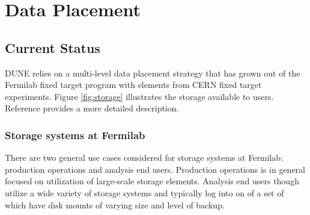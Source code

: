 \documentclass[../main-v1.tex]{subfiles}
\begin{document}
\chapter{Data Placement  }
\label{ch:place}

\section{Current Status}

DUNE relies on a multi-level data placement strategy that has grown out of the Fermilab fixed target program with elements from CERN fixed target experiments.  Figure \ref{fig:storage} illustrates the storage available to users. Reference \cite{bib:storage} provides a more detailed description. 

\subsection{Storage systems at Fermilab}

There are two general use cases considered for storage systems at Fermilab: production operations and analysis end users. Production operations is in general focused on utilization of large-scale storage elements. Analysis end users though utilize a wide variety of storage systems and typically log into on of a set of   which have disk mounts of varying size and level of backup. 
\end{document}
